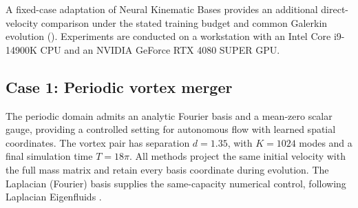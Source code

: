 A fixed-case adaptation of Neural Kinematic Bases {\citep{liu2025neural}} provides an additional direct-velocity comparison under the stated training budget and common Galerkin evolution (). Experiments are conducted on a workstation with an Intel Core i9-14900K CPU and an NVIDIA GeForce RTX 4080 SUPER GPU.

\subsection{Case 1: Periodic vortex merger}
\label{sec:case1}
The periodic domain admits an analytic Fourier basis and a mean-zero scalar gauge, providing a controlled setting for autonomous flow with learned spatial coordinates. The vortex pair has separation $d=1.35$, with $K=1024$ modes and a final simulation time $T=18\pi$. All methods project the same initial velocity with the full mass matrix and retain every basis coordinate during evolution. {The Laplacian (Fourier) basis supplies the same-capacity numerical control, following Laplacian Eigenfluids \citep{dewitt2012fluid}.}

